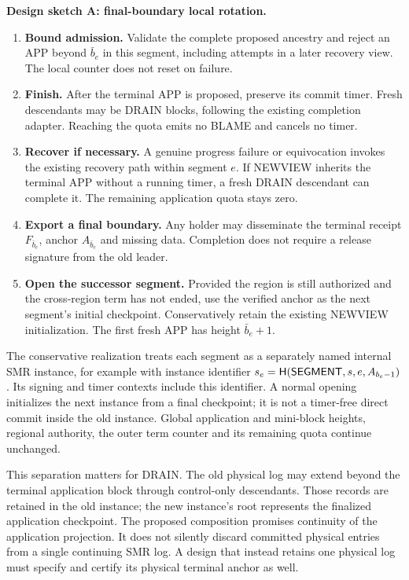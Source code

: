 \begin{mdframed}[linewidth=.6pt,skipabove=9pt,skipbelow=9pt]
\small\noindent\textbf{Design sketch A: final-boundary local rotation.}
\begin{enumerate}[label=\textbf{A\arabic*.}]
\item \textbf{Bound admission.} Validate the complete proposed ancestry and
reject an APP beyond $\bar b_e$ in this segment, including attempts in a later
recovery view. The local counter does not reset on failure.
\item \textbf{Finish.} After the terminal APP is proposed, preserve its
commit timer. Fresh descendants may be DRAIN blocks, following the existing
completion adapter. Reaching the quota emits no BLAME and cancels no timer.
\item \textbf{Recover if necessary.} A genuine progress failure or
equivocation invokes the existing recovery path within segment $e$.
If NEWVIEW inherits the terminal APP without a running timer, a fresh DRAIN
descendant can complete it. The remaining application quota stays zero.
\item \textbf{Export a final boundary.} Any holder may disseminate the
terminal receipt $F_{\bar b_e}$, anchor $A_{\bar b_e}$ and missing data.
Completion does not require a release signature from the old leader.
\item \textbf{Open the successor segment.} Provided the region is still
authorized and the cross-region term has not ended, use the verified anchor
as the next segment's initial checkpoint. Conservatively retain the existing
NEWVIEW initialization. The first fresh APP has height $\bar b_e+1$.
\end{enumerate}
\end{mdframed}

The conservative realization treats each segment as a separately named
internal SMR instance, for example with instance identifier
$s_e=\mathsf H(\mathsf{SEGMENT},s,e,A_{b_e-1})$. Its signing and timer contexts
include this identifier. A normal opening initializes the next instance
from a final checkpoint; it is not a timer-free direct commit inside the
old instance. Global application and mini-block heights, regional authority,
the outer term counter and its remaining quota continue unchanged.

This separation matters for DRAIN. The old physical log may extend beyond
the terminal application block through control-only descendants. Those
records are retained in the old instance; the new instance's root represents
the finalized application checkpoint. The proposed composition promises
continuity of the application projection. It does not silently discard
committed physical entries from a single continuing SMR log. A design that
instead retains one physical log must specify and certify its physical
terminal anchor as well.

